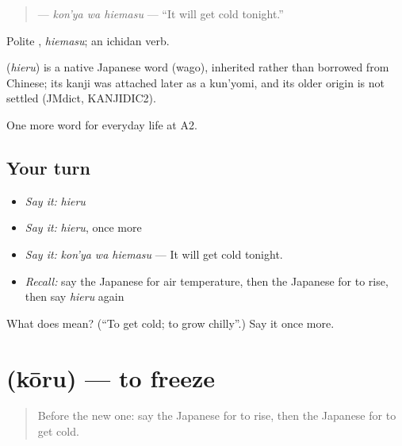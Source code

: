 \begin{quote}
\textbf{ } — \emph{kon'ya wa hiemasu} — \textquotedblleft{}It will get cold tonight.\textquotedblright{}
\end{quote}

Polite \textbf{}, \emph{hiemasu}; an ichidan verb.

\begin{cousinweb}
\textbf{} (\emph{hieru}) is a native Japanese word (wago), inherited rather than borrowed from Chinese; its kanji was attached later as a kun'yomi, and its older origin is not settled (JMdict, KANJIDIC2).
\end{cousinweb}

\begin{grammarlens}[title={What you've built}]
One more word for everyday life at A2.
\end{grammarlens}

\subsection*{Your turn}
\begin{itemize}
\raggedright
  \item \emph{Say it:} \emph{hieru}
  \item \emph{Say it:} \emph{hieru}, once more
  \item \emph{Say it:} \emph{kon'ya wa hiemasu} — It will get cold tonight.
  \item \emph{Recall:} say the Japanese for air temperature, then the Japanese for to rise, then say \emph{hieru} again
\end{itemize}

\begin{tcolorbox}[breakable,colback=teal!4,colframe=teal!35!black,title={Before you move on}]
What does  mean? (\textquotedblleft{}To get cold; to grow chilly\textquotedblright{}.) Say it once more.
\end{tcolorbox}
\section[\texorpdfstring{\ja{こおる} (kōru)}{こおる (kōru)}]{ (kōru) — to freeze}

\label{lesson:JA-C212-kooru}



\begin{quote}
Before the new one: say the Japanese for to rise, then the Japanese for to get cold.
\end{quote}

